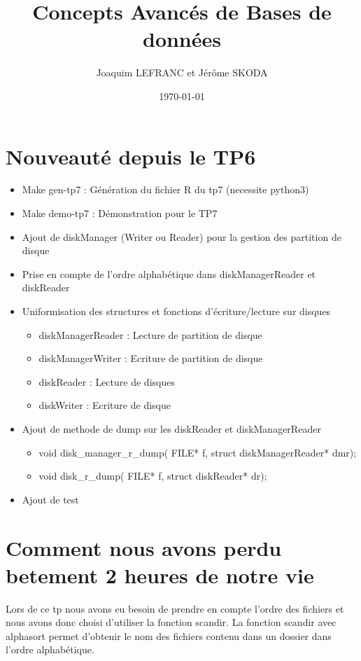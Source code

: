 \documentclass[a4paper]{article}
\title{Concepts Avancés de Bases de données}
\author{Joaquim LEFRANC et Jérôme SKODA}
\date{\today}
\begin{document}
\maketitle


\section{Nouveauté depuis le TP6}

\begin{itemize}
  \item Make gen-tp7 : Génération du fichier R du tp7 (necessite python3)
  \item Make demo-tp7 : Démonstration pour le TP7
  \item Ajout de diskManager (Writer ou Reader) pour la gestion des partition de disque
  \item Prise en compte de l'ordre alphabétique dans diskManagerReader et diskReader
  \item Uniformisation des structures et fonctions  d'écriture/lecture sur disques
  \begin{itemize}
    \item diskManagerReader : Lecture de partition de disque
    \item diskManagerWriter : Ecriture de partition de disque
    \item diskReader : Lecture de disques
    \item diskWriter : Ecriture de disque
  \end{itemize}
  \item Ajout de methode de dump sur les diskReader et diskManagerReader
  \begin{itemize}
    \item void disk\_manager\_r\_dump( FILE* f,  struct diskManagerReader* dmr);
    \item void disk\_r\_dump( FILE* f,  struct diskReader* dr);
  \end{itemize}
  \item Ajout de test
\end{itemize}

\section{Comment nous avons perdu betement 2 heures de notre vie}

Lors de ce tp nous avons eu besoin de prendre en compte l'ordre des fichiers
et nous avons donc choisi d'utiliser la fonction scandir.
La fonction scandir avec alphasort permet d'obtenir le nom des fichiers contenu
dans un dossier dans l'ordre alphabétique.
\end{document}
